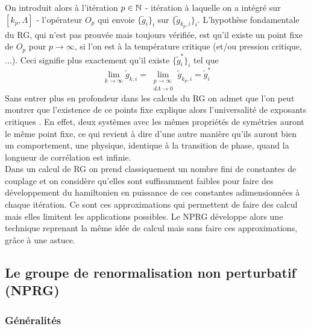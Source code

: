 \documentclass[10pt]{article}
\begin{document}
\begin{multicols}{2}
 On introduit alors à l'itération $p \in \mathbb{N}$ - itération à laquelle on a intégré sur $[k_p, \Lambda]$ - l'opérateur $O_p$ qui envoie $\{\tilde{g}_i\}_i$ sur $\{\tilde{g}_{k_p,i}\}_i$. L'hypothèse fondamentale du RG, qui n'est pas prouvée mais toujours vérifiée, est qu'il existe un point fixe de $O_p$ pour $p \to \infty$, si l'on est à la température critique (et/ou pression critique, ...). Ceci signifie plus exactement qu'il existe $\{\tilde{g}^*_i\}_i$ tel que 
 \begin{equation}
 	\lim\limits_{k \rightarrow \infty}  \tilde{g}_{k,i} = \lim\limits_{\substack{p \to \infty \\ d\Lambda \to 0 }}  \tilde{g}_{k_p,i} =  \tilde{g}^*_i
 \end{equation} 
Sans entrer plus en profondeur dans les calculs du RG on admet que l'on peut montrer que l'existence de ce points fixe explique alors l'universalité de exposants critiques \cite{Delamotte2012}. En effet, deux systèmes avec les mêmes propriétés de symétries auront le même point fixe, ce qui revient à dire d'une autre manière qu'ils auront bien un comportement, une physique, identique à la transition de phase, quand la longueur de corrélation est infinie. \\
 
Dans un calcul de RG on prend classiquement un nombre fini de constantes de couplage et on considère qu'elles sont suffisamment faibles pour faire des développement du hamiltonien en puissance de ces constantes adimensionnées à chaque itération. Ce sont ces approximations qui permettent de faire des calcul mais elles limitent les applications possibles. Le NPRG développe alors une technique reprenant la même idée de calcul mais sans faire ces approximations, grâce à une astuce.

\vspace*{11pt}
\subsection{Le groupe de renormalisation non perturbatif (NPRG)}
\subsubsection{Généralités}


\end{multicols}
\end{document}
